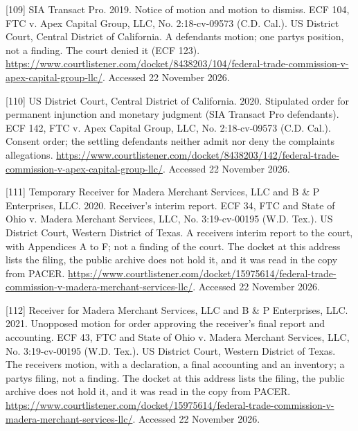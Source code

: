 \documentclass[
  11pt,
]{article}
\newlength{\cslhangindent}
\newlength{\cslentryspacingunit} %
\newenvironment{CSLReferences}[2] %
 {%
  \setlength{\parindent}{0pt}
  \ifodd #1
  \let\oldpar\par
  \def\par{\hangindent=\cslhangindent\oldpar}
  \fi
  \setlength{\parskip}{#2\cslentryspacingunit}
 }%
 {}
\begin{document}
\begin{CSLReferences}{1}{1}
\leavevmode{}%
{[}109{]} SIA Transact Pro. 2019. Notice of motion and motion to
dismiss. ECF 104, FTC v. Apex Capital Group, LLC, No. 2:18-cv-09573
(C.D. Cal.). US District Court, Central District of California. A
defendant\textquotesingle s motion; one party\textquotesingle s
position, not a finding. The court denied it (ECF 123).
\url{https://www.courtlistener.com/docket/8438203/104/federal-trade-commission-v-apex-capital-group-llc/}.
Accessed 22 November 2026.

\leavevmode{}%
{[}110{]} US District Court, Central District of California. 2020.
Stipulated order for permanent injunction and monetary judgment (SIA
Transact Pro defendants). ECF 142, FTC v. Apex Capital Group, LLC, No.
2:18-cv-09573 (C.D. Cal.). Consent order; the settling defendants
neither admit nor deny the complaint\textquotesingle s allegations.
\url{https://www.courtlistener.com/docket/8438203/142/federal-trade-commission-v-apex-capital-group-llc/}.
Accessed 22 November 2026.

\leavevmode{}%
{[}111{]} Temporary Receiver for Madera Merchant Services, LLC and B \&
P Enterprises, LLC. 2020. Receiver's interim report. ECF 34, FTC and
State of Ohio v. Madera Merchant Services, LLC, No. 3:19-cv-00195 (W.D.
Tex.). US District Court, Western District of Texas. A
receiver\textquotesingle s interim report to the court, with Appendices
A to F; not a finding of the court. The docket at this address lists the
filing, the public archive does not hold it, and it was read in the copy
from PACER.
\url{https://www.courtlistener.com/docket/15975614/federal-trade-commission-v-madera-merchant-services-llc/}.
Accessed 22 November 2026.

\leavevmode{}%
{[}112{]} Receiver for Madera Merchant Services, LLC and B \& P
Enterprises, LLC. 2021. Unopposed motion for order approving the
receiver's final report and accounting. ECF 43, FTC and State of Ohio v.
Madera Merchant Services, LLC, No. 3:19-cv-00195 (W.D. Tex.). US
District Court, Western District of Texas. The
receiver\textquotesingle s motion, with a declaration, a final
accounting and an inventory; a party\textquotesingle s filing, not a
finding. The docket at this address lists the filing, the public archive
does not hold it, and it was read in the copy from PACER.
\url{https://www.courtlistener.com/docket/15975614/federal-trade-commission-v-madera-merchant-services-llc/}.
Accessed 22 November 2026.


\end{CSLReferences}
\end{document}
